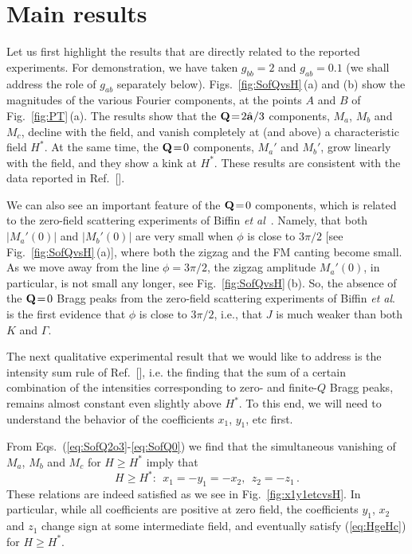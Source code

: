 \documentclass[prx,aps,groupedaddress,twocolumn]{revtex4-1}
\def\cdbl{\color{darkblue}}
\def\be{\begin{equation}}
\def\ee{\end{equation}}
\begin{document}
\vspace*{-0.25cm} 
\section{Main results}
\vspace*{-0.3cm}
Let us first highlight the results that are directly related to the reported experiments.
%
For demonstration, we have taken $g_{bb}\!=\!2$ and $g_{ab}\!=\!0.1$ (we shall address the role of $g_{ab}$ separately below).
%
Figs.~\ref{fig:SofQvsH}\,(a) and (b) show the magnitudes of the various Fourier components, at the points $A$ and $B$ of Fig.~\ref{fig:PT}\,(a). 
%
The results show that the ${\bf Q}\!=\!2\hat{{\bf a}}/3$ components, $M_a$, $M_b$ and $M_c$, decline with the field, and vanish completely at (and above) a characteristic field $H^\ast$. 
%
At the same time, the ${\bf Q}\!=\!0$ components, $M_a'$ and $M_b'$, grow linearly with the field, and they show a kink at $H^\ast$. These results are consistent with the data reported in Ref.~[].

We can also see an important feature of the ${\bf Q}\!=\!0$ components, which is related to the zero-field scattering experiments of Biffin {\it et al}~\cite{Biffin2014a}.
%
Namely, that both $|M_a'(0)|$ and $|M_b'(0)|$ are very small when $\phi$ is close to $3\pi/2$ [see Fig.~\ref{fig:SofQvsH}\,(a)], where both the zigzag and the FM canting become small. 
%
As we move away from the line $\phi\!=\!3\pi/2$, the zigzag amplitude $M_a'(0)$, in particular, is not small any longer, see Fig.~\ref{fig:SofQvsH}\,(b). 
%
So, the absence of the ${\bf Q}\!=\!0$ Bragg peaks from the zero-field scattering experiments of Biffin {\it et al}.~\cite{Biffin2014a} is the first evidence that $\phi$ is close to $3\pi/2$, i.e., that $J$ is much weaker than both $K$ and $\Gamma$. 
 

The next qualitative experimental result that we would like to address is the intensity sum rule of Ref.~[], i.e. the finding that the sum of a certain combination of the intensities corresponding to zero- and finite-$Q$ Bragg peaks, remains almost constant even slightly above $H^\ast$.
%
To this end, we will need to understand the behavior of the coefficients $x_1$, $y_1$, etc first. 

From Eqs.~(\ref{eq:SofQ2o3}-\ref{eq:SofQ0}) we find that the simultaneous vanishing of $M_a$, $M_b$ and $M_c$ for $H\!\ge\!H^\ast$ imply that 
\be\label{eq:HgeHc}
H\ge H^\ast:~~x_1=-y_1=-x_2, ~~
z_2=-z_1\,.
\ee
These relations are indeed satisfied as we see in Fig.~\ref{fig:x1y1etcvsH}. In particular, while all coefficients are positive at zero field, the coefficients $y_1$, $x_2$ and $z_1$ change sign at some intermediate field, and eventually satisfy (\ref{eq:HgeHc}) for $H\ge H^\ast$. 
\end{document}
